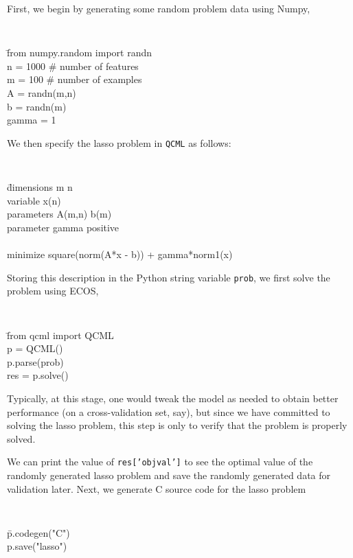 \documentclass[11pt]{article}
\def\qcml{\texttt{QCML}\xspace}
\begin{document}
First, we begin by generating some random problem data using Numpy,
{\tt
\begin{tabbing}
\qquad \= from numpy.random import randn\\
\> n = 1000    \# number of features\\
\> m = 100     \# number of examples\\
\> A = randn(m,n)\\
\> b = randn(m)\\
\> gamma = 1
\end{tabbing}
}
\noindent We then specify the lasso problem in \qcml as follows:
{\tt
\begin{tabbing}
\qquad 
\= dimensions m n \\
\> variable x(n) \\
\> parameters A(m,n) b(m)\\ 
\> parameter gamma positive\\
\\
\> minimize square(norm(A*x - b)) + gamma*norm1(x)
\end{tabbing}
}
\noindent Storing this description in the Python string variable {\tt prob},
we first solve the problem using ECOS,
{\tt
\begin{tabbing}
\qquad \= from qcml import QCML\\
\> p = QCML()\\
\> p.parse(prob)\\
\> res = p.solve()
\end{tabbing}
}
\noindent Typically, at this stage, one would tweak the model as needed to
obtain better performance (on a cross-validation set, say), but since we 
have committed to solving the lasso problem, this step is only to verify that 
the problem is properly solved.

We can print the value of {\tt res['objval']} to see the optimal
value of the randomly generated lasso problem and save the randomly generated
data for validation later. Next, we generate C source
code for the lasso problem
{\tt
\begin{tabbing}
\qquad \= p.codegen("C")\\
\> p.save("lasso")
\end{tabbing}
}
\end{document}

